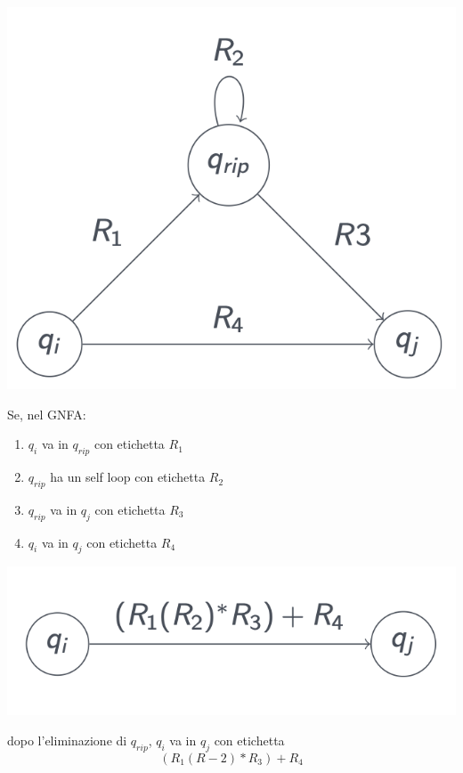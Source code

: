 \mezzapagina
\begin{center}
	\includegraphics[scale=0.5]{img/GNFA_2.png}
\end{center}
\spazio
Se, nel GNFA:
\begin{enumerate}
	\item $q_i$ va in $q_{rip}$ con etichetta $R_1$ 
	\item $q_{rip}$ ha un self loop con etichetta $R_2$ 
	\item $q_{rip}$ va in $q_j$ con etichetta $R_3$ 
	\item $q_i$ va in $q_j$ con etichetta $R_4$ 
\end{enumerate}
\finemezzapagina

\mezzapagina
\begin{center}
	\includegraphics[scale=0.5]{img/GNFA_3.png}
\end{center}
\spazio
dopo l'eliminazione di $q_{rip}$, $q_i$ va in $q_j$ con etichetta 
$$(R_1(R-2)*R_3)+R_4$$
\finemezzapagina

